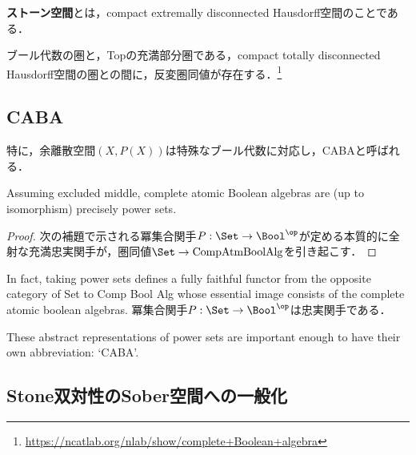 \documentclass[uplatex,dvipdfmx]{jsreport}
\begin{document}
\begin{definition}
    \textbf{ストーン空間}とは，compact extremally disconnected Hausdorff空間のことである．
\end{definition}

\begin{theorem}
    ブール代数の圏と，Topの充満部分圏である，compact totally disconnected Hausdorff空間の圏との間に，反変圏同値が存在する．\footnote{\url{https://ncatlab.org/nlab/show/complete+Boolean+algebra}}
\end{theorem}

\subsection{CABA}

特に，余離散空間$(X,P(X))$は特殊なブール代数に対応し，CABAと呼ばれる．

\begin{corollary}
    Assuming excluded middle, complete atomic Boolean algebras are (up to isomorphism) precisely power sets.
\end{corollary}
\begin{proof}
    次の補題で示される冪集合関手$P:\Set\to\Bool^\op$が定める本質的に全射な充満忠実関手が，圏同値$\Set\to\textrm{CompAtmBoolAlg}$を引き起こす．
\end{proof}

\begin{lemma}
    In fact, taking power sets defines a fully faithful functor from the opposite category of Set to Comp Bool Alg whose essential image consists of the complete atomic boolean algebras.
    冪集合関手$P:\Set\to\Bool^\op$は忠実関手である．
\end{lemma}

\begin{definition}[CABA]
    These abstract representations of power sets are important enough to have their own abbreviation: ‘CABA’.
\end{definition}

\subsection{Stone双対性のSober空間への一般化}
\end{document}
